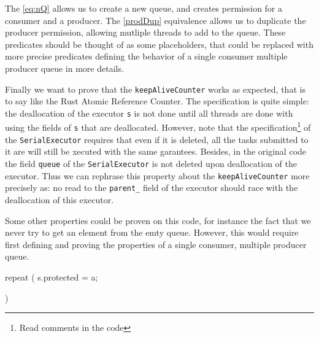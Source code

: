 The \eqref{eq:nQ} allows us to create a new queue, and creates permission for a consumer and a producer. The \eqref{prodDup} equivalence allows us to duplicate the producer permission, allowing mutliple threads to add to the queue. These predicates should be thought of as some placeholders, that could be replaced with more precise predicates defining the behavior of a single consumer multiple producer queue in more details.

Finally we want to prove that the \texttt{keepAliveCounter} works as expected, that is to say like the Rust Atomic Reference Counter. The specification is quite simple: the deallocation of the executor \texttt{s} is not done until all threads are done with using the fields of \texttt{s} that are deallocated. However, note that the specification\footnote{Read comments in the code} of the \texttt{SerialExecutor} requires that even if it is deleted, all the tasks submitted to it are will still be xecuted with the same garantees. Besides, in the original code the field \texttt{queue} of the \texttt{SerialExecutor} is not deleted upon deallocation of the executor. Thus we can rephrase this property about the \texttt{keepAliveCounter} more precisely as: no read to the \texttt{parent\_} field of the executor should race with the deallocation of this executor.

Some other properties could be proven on this code, for instance the fact that we never try to get an element from the emty queue. However, this would require first defining and proving the properties of a single consumer, multiple producer queue.



repeat (
		s.protected = a;
		
	)
	

